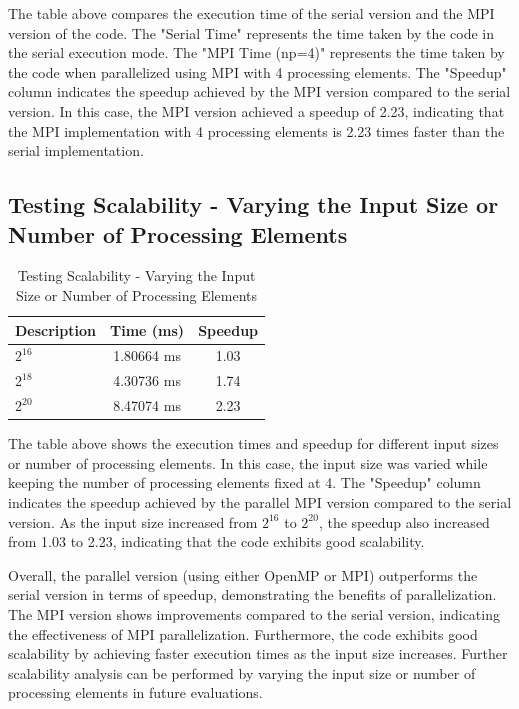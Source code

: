 The table above compares the execution time of the serial version and the MPI version of the code. The "Serial Time" represents the time taken by the code in the serial execution mode. The "MPI Time (np=4)" represents the time taken by the code when parallelized using MPI with 4 processing elements. The "Speedup" column indicates the speedup achieved by the MPI version compared to the serial version. In this case, the MPI version achieved a speedup of 2.23, indicating that the MPI implementation with 4 processing elements is 2.23 times faster than the serial implementation.

\subsection*{Testing Scalability - Varying the Input Size or Number of Processing Elements}

\begin{table}[htbp]
  \caption{Testing Scalability - Varying the Input Size or Number of Processing Elements}
  \centering
  \begin{tabular}{lcc}
    \toprule
    \textbf{Description} & \textbf{Time (ms)} & \textbf{Speedup} \\
    \midrule
    $2^{16}$ & 1.80664 ms & 1.03 \\
    $2^{18}$ & 4.30736 ms & 1.74 \\
    $2^{20}$ & 8.47074 ms & 2.23 \\
    \bottomrule
  \end{tabular}
\end{table}

The table above shows the execution times and speedup for different input sizes or number of processing elements. In this case, the input size was varied while keeping the number of processing elements fixed at 4. The "Speedup" column indicates the speedup achieved by the parallel MPI version compared to the serial version. As the input size increased from $2^{16}$ to $2^{20}$, the speedup also increased from 1.03 to 2.23, indicating that the code exhibits good scalability.

Overall, the parallel version (using either OpenMP or MPI) outperforms the serial version in terms of speedup, demonstrating the benefits of parallelization. The MPI version shows improvements compared to the serial version, indicating the effectiveness of MPI parallelization. Furthermore, the code exhibits good scalability by achieving faster execution times as the input size increases. Further scalability analysis can be performed by varying the input size or number of processing elements in future evaluations.

